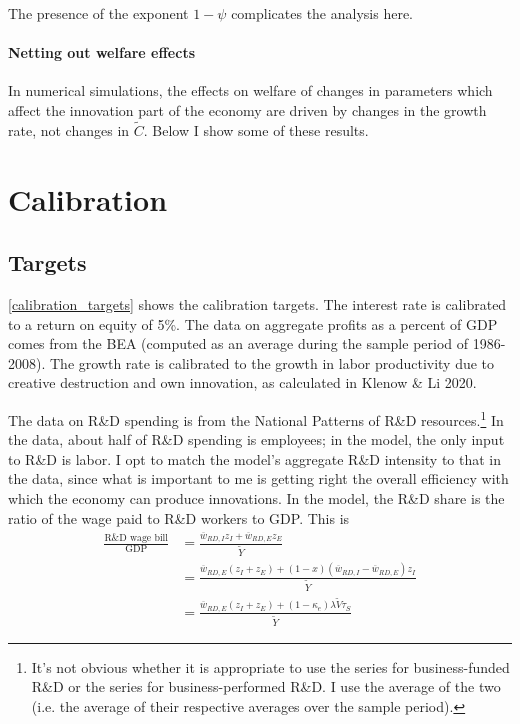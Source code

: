 \documentclass[12pt,english]{article}
\theoremstyle{remark}
\begin{document}
The presence of the exponent $1-\psi$ complicates the analysis here. 

\paragraph{Netting out welfare effects}

In numerical simulations, the effects on welfare of changes in parameters which affect the innovation part of the economy are driven by changes in the growth rate, not changes in $\tilde{C}$. Below I show some of these results.

\section{Calibration}

\subsection{Targets}

\autoref{calibration_targets} shows the calibration targets. The interest rate is calibrated to a return on equity of 5\%. The data on aggregate profits as a percent of GDP comes from the BEA (computed as an average during the sample period of 1986-2008). The growth rate is calibrated to the growth in labor productivity due to creative destruction and own innovation, as calculated in Klenow \& Li 2020. 

The data on R\&D spending is from the National Patterns of R\&D resources.\footnote{It's not obvious whether it is appropriate to use the series for business-funded R\&D or the series for business-performed R\&D. I use the average of the two (i.e. the average of their respective averages over the sample period).} In the data, about half of R\&D spending is employees; in the model, the only input to R\&D is labor. I opt to match the model's aggregate R\&D intensity to that in the data, since what is important to me is getting right the overall efficiency with which the economy can produce innovations. In the model, the R\&D share is the ratio of the wage paid to R\&D workers to GDP. This is
\begin{align*}
	\frac{\textrm{R\&D wage bill}}{\textrm{GDP}} &= \frac{\overline{w}_{RD,I} z_I + \overline{w}_{RD,E} z_E}{\tilde{Y}} \\ 
	     &= \frac{\overline{w}_{RD,E} (z_I + z_E) + (1-x)(\overline{w}_{RD,I} - \overline{w}_{RD,E})z_I}{\tilde{Y}} \\
	     &= \frac{\overline{w}_{RD,E} (z_I + z_E) + (1-\kappa_e) \lambda \tilde{V} \tau_S}{\tilde{Y}}
\end{align*}
\end{document}
